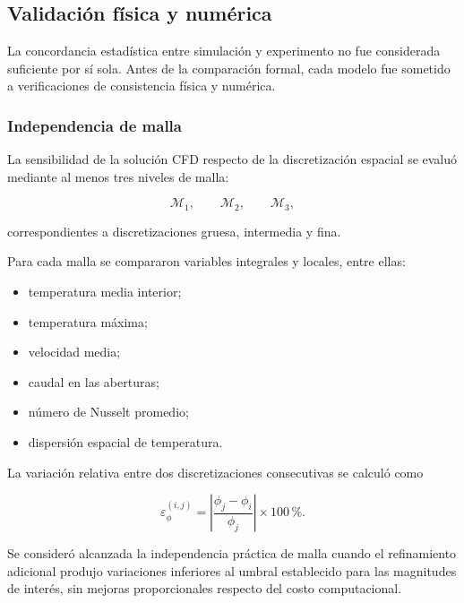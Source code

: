 \subsection{Validación física y numérica}
\label{subsec:validacion_fisica_numerica}

La concordancia estadística entre simulación y experimento no fue considerada suficiente por sí sola. Antes de la comparación formal, cada modelo fue sometido a verificaciones de consistencia física y numérica.

\subsubsection{Independencia de malla}
\label{subsubsec:independencia_malla}

La sensibilidad de la solución CFD respecto de la discretización espacial se evaluó mediante al menos tres niveles de malla:

\begin{equation}
\mathcal{M}_1,\qquad
\mathcal{M}_2,\qquad
\mathcal{M}_3,
\end{equation}

correspondientes a discretizaciones gruesa, intermedia y fina.

Para cada malla se compararon variables integrales y locales, entre ellas:

\begin{itemize}
    \item temperatura media interior;
    \item temperatura máxima;
    \item velocidad media;
    \item caudal en las aberturas;
    \item número de Nusselt promedio;
    \item dispersión espacial de temperatura.
\end{itemize}

La variación relativa entre dos discretizaciones consecutivas se calculó como

\begin{equation}
\varepsilon_{\phi}^{(i,j)}
=
\left|
\frac{\phi_j-\phi_i}{\phi_j}
\right|
\times 100\,\%.
\label{eq:error_independencia_malla}
\end{equation}

Se consideró alcanzada la independencia práctica de malla cuando el refinamiento adicional produjo variaciones inferiores al umbral establecido para las magnitudes de interés, sin mejoras proporcionales respecto del costo computacional.

